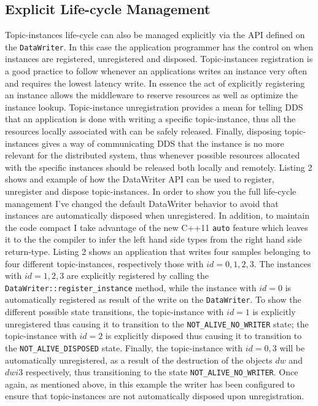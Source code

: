 \subsection{Explicit Life-cycle Management}
Topic-instances life-cycle can also be managed explicitly via the API
defined on the \texttt{DataWriter}. In this case the application programmer 
has the control on when instances are registered, unregistered and disposed. 
Topic-instances registration is a good practice to follow whenever an 
applications writes an instance very often and requires the lowest latency 
write. In essence the act of explicitly registering an instance allows the 
middleware to reserve resources as well as optimize the instance lookup. 
Topic-instance unregistration provides a mean for telling \ac{DDS} that an 
application is done with writing a specific topic-instance, thus all the  
resources locally associated with can be safely released. Finally,  
disposing topic-instances gives a way of communicating DDS that the instance 
is no more relevant for the distributed system, thus whenever possible resources 
allocated with the specific instances should be released both locally and remotely.
Listing 2 shows and example of how the DataWriter API can be used to register, 
unregister and dispose topic-instances.  In order to show you the full life-cycle 
management I’ve changed the default DataWriter behavior to avoid that instances 
are automatically disposed when unregistered. In addition, to maintain the code 
compact I take advantage of the new C++11 \texttt{auto} feature which leaves it to the  
the compiler to infer the left hand side types from the right hand side 
return-type. Listing 2 shows an application that writes four samples belonging 
to four different topic-instances, respectively those with $id=0,1,2,3$.  
The instances with $id=1,2,3$ are explicitly registered by calling the 
\texttt{DataWriter::register\_instance} method, while the instance with $id=0$ 
is automatically registered as result of the write on the \texttt{DataWriter}. 
To show the different possible state transitions, the topic-instance 
with $id=1$ is explicitly unregistered thus causing it to transition to 
the \texttt{NOT\_ALIVE\_NO\_WRITER} state; the topic-instance with $id=2$ 
is explicitly disposed thus causing it to transition to the 
\texttt{NOT\_ALIVE\_DISPOSED} state.  Finally, the topic-instance with 
$id=0,3$ will be automatically unregistered, as a result of the destruction 
of the objects $dw$ and $dwi3$ respectively, thus transitioning to the state 
\texttt{NOT\_ALIVE\_NO\_WRITER}. Once again, as mentioned above, in this 
example the writer has been configured to ensure that topic-instances are 
not automatically disposed upon unregistration.

